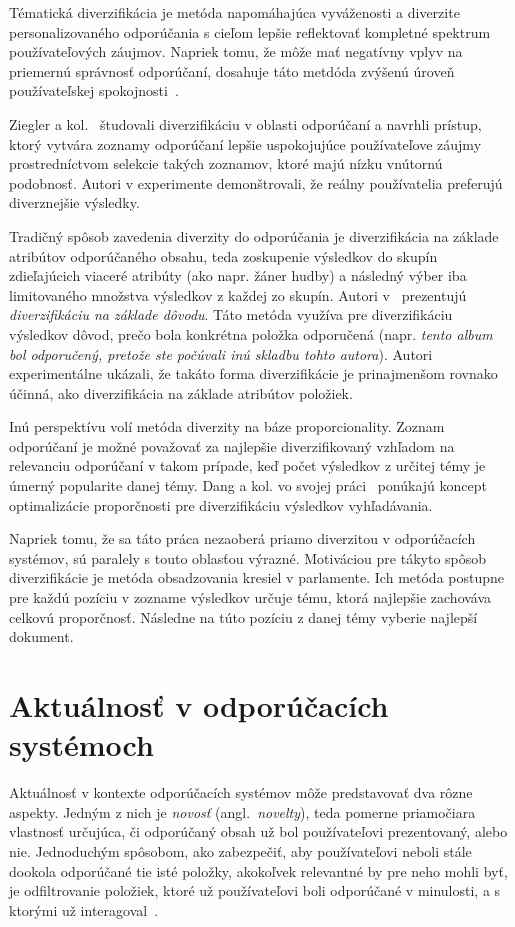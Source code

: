 Tématická diverzifikácia je metóda napomáhajúca vyváženosti a diverzite personalizovaného odporúčania s cieľom
lepšie reflektovať kompletné spektrum používateľových záujmov. Napriek tomu, že môže mať negatívny vplyv na priemernú
správnosť odporúčaní, dosahuje táto metdóda zvýšenú úroveň používateľskej spokojnosti~\cite{Zhang2009}.

Ziegler a kol.~\cite{Ziegler2005} študovali diverzifikáciu v oblasti odporúčaní a navrhli prístup, ktorý vytvára
zoznamy odporúčaní lepšie uspokojujúce používateľove záujmy prostredníctvom selekcie takých zoznamov, ktoré majú nízku
vnútornú podobnosť. Autori v experimente demonštrovali, že reálny používatelia preferujú diverznejšie výsledky.

Tradičný spôsob zavedenia diverzity do odporúčania je diverzifikácia na základe atribútov odporúčaného obsahu, teda
zoskupenie výsledkov do skupín zdieľajúcich viaceré atribúty (ako napr. žáner hudby) a následný výber iba limitovaného
množstva výsledkov z každej zo skupín. Autori v~\cite{Yu2009} prezentujú \emph{diverzifikáciu na základe dôvodu}.
Táto metóda využíva pre diverzifikáciu výsledkov dôvod, prečo bola konkrétna položka odporučená
(napr. \textit{tento album bol odporučený, pretože ste počúvali inú skladbu tohto autora}). Autori experimentálne ukázali,
že takáto forma diverzifikácie je prinajmenšom rovnako účinná, ako diverzifikácia na základe atribútov položiek.

Inú perspektívu volí metóda diverzity na báze proporcionality. Zoznam odporúčaní je možné považovať za najlepšie diverzifikovaný
vzhľadom na relevanciu odporúčaní v takom prípade, keď počet výsledkov z určitej témy je úmerný popularite danej témy.
Dang a kol. vo svojej práci~\cite{Dang2012} ponúkajú koncept optimalizácie proporčnosti pre diverzifikáciu výsledkov
vyhľadávania.

Napriek tomu, že sa táto práca nezaoberá priamo diverzitou v odporúčacích systémov, sú paralely s touto
oblasťou výrazné. Motiváciou pre tákyto spôsob diverzifikácie je metóda obsadzovania kresiel v parlamente. Ich metóda
postupne pre každú pozíciu v zozname výsledkov určuje tému, ktorá najlepšie zachováva celkovú proporčnosť. Následne
na túto pozíciu z danej témy vyberie najlepší dokument.


\section{Aktuálnosť v odporúčacích systémoch}

Aktuálnosť v kontexte odporúčacích systémov môže predstavovať dva rôzne aspekty. Jedným z nich je \emph{novosť}
(angl.~\emph{novelty}), teda pomerne priamočiara vlastnosť určujúca, či odporúčaný obsah už bol používateľovi prezentovaný,
alebo nie. Jednoduchým spôsobom, ako zabezpečiť, aby používateľovi neboli stále dookola odporúčané tie isté položky,
akokoľvek relevantné by pre neho mohli byť, je odfiltrovanie položiek, ktoré už používateľovi boli odporúčané v minulosti,
a s ktorými už interagoval~\cite{Handbook2011}.

